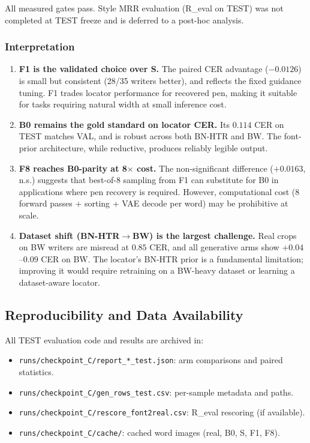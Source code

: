 \documentclass[10.5pt,a4paper]{article}
\newcommand{\fp}[1]{\nolinkurl{#1}}
\begin{document}
All measured gates pass. Style MRR evaluation (R\_eval on TEST) was not completed at TEST freeze and is deferred to a post-hoc analysis.

\subsubsection{Interpretation}

\begin{enumerate}
\item \textbf{F1 is the validated choice over S.} The paired CER advantage ($-0.0126$) is small but consistent (28/35 writers better), and reflects the fixed guidance tuning. F1 trades locator performance for recovered pen, making it suitable for tasks requiring natural width at small inference cost.

\item \textbf{B0 remains the gold standard on locator CER.} Its $0.114$ CER on TEST matches VAL, and is robust across both BN-HTR and BW. The font-prior architecture, while reductive, produces reliably legible output.

\item \textbf{F8 reaches B0-parity at 8$\times$ cost.} The non-significant difference ($+0.0163$, n.s.) suggests that best-of-8 sampling from F1 can substitute for B0 in applications where pen recovery is required. However, computational cost (8 forward passes + sorting + VAE decode per word) may be prohibitive at scale.

\item \textbf{Dataset shift (BN-HTR$\to$BW) is the largest challenge.} Real crops on BW writers are misread at $0.85$ CER, and all generative arms show $+0.04$--$0.09$ CER on BW. The locator's BN-HTR prior is a fundamental limitation; improving it would require retraining on a BW-heavy dataset or learning a dataset-aware locator.
\end{enumerate}

\subsection{Reproducibility and Data Availability}

All TEST evaluation code and results are archived in:
\begin{itemize}
\item \fp{runs/checkpoint_C/report\_*\_test.json}: arm comparisons and paired statistics.
\item \fp{runs/checkpoint_C/gen\_rows\_test.csv}: per-sample metadata and paths.
\item \fp{runs/checkpoint_C/rescore\_font2real.csv}: R\_eval rescoring (if available).
\item \fp{runs/checkpoint_C/cache/}: cached word images (real, B0, S, F1, F8).
\end{itemize}
\end{document}
